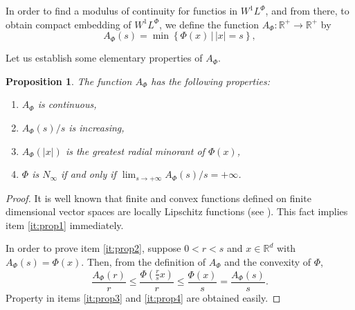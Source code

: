 \documentclass[twoside]{article}
\newtheorem{prop}[thm]{Proposition}
\theoremstyle{remark}
\newcommand{\lphi}{L^{\Phi}}
\newcommand{\wphi}{W^{1}\lphi}
\newcommand{\rr}{\mathbb{R}}
\renewcommand{\leq}{\leqslant}
\begin{document}
In order to find a modulus of continuity for functios in $\wphi$, and from there, to obtain compact embedding of $\wphi$, we define the function $A_{\Phi}:\rr^+\to\rr^+$ by
\begin{equation}\label{eq:inversa-gral}
A_{\Phi}(s)=\min\left\{\Phi(x)\,\big|\,|x|=s\right\},
\end{equation}

Let us establish some elementary properties of $A_{\Phi}$.
\begin{prop}\label{prop:AsubPhi} The function $A_{\Phi}$ has the following properties:
\begin{enumerate}
 \item\label{it:prop1} $A_{\Phi}$ is continuous,
 \item\label{it:prop2} $A_{\Phi}(s)/s$ is increasing,
 \item\label{it:prop3} $A_{\Phi}(|x|)$ is the \emph{greatest radial minorant} of 
 $\Phi(x)$,
 \item\label{it:prop4} $\Phi$ is $N_{\infty}$ if and only if $\lim_{s\to+\infty} A_{\Phi}(s)/s=+\infty$.
\end{enumerate}
\end{prop}

\begin{proof} It is well known that finite and convex functions defined on finite dimensional 
vector spaces are locally Lipschitz functions (see \cite{clarke2013functional}). This fact 
implies item \ref{it:prop1} immediately. 

In order to prove item \ref{it:prop2}, suppose $0<r<s$ and $x\in\rr^d$ with $A_{\Phi}(s)
=\Phi(x)$. Then, from the definition of $A_{\Phi}$ and the convexity of $\Phi$,
\[\frac{A_{\Phi}(r)}{r}\leq \frac{\Phi\left(\frac{r}{s}x\right)}{r}\leq \frac{\Phi\left(x\right)}{s}=
 \frac{A_{\Phi}(s)}{s}.
\]
Property in items \ref{it:prop3} and \ref{it:prop4} are obtained easily.

 
\end{proof}
\end{document}
